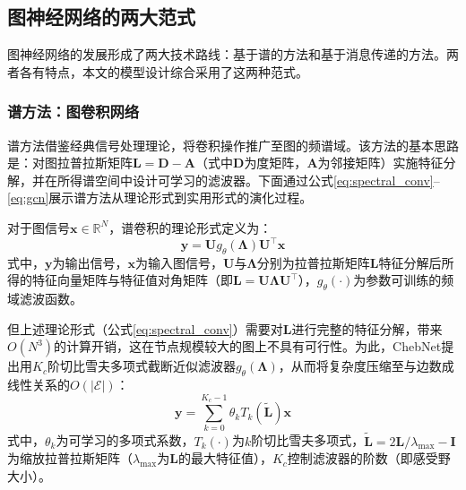 \subsection{图神经网络的两大范式}
\label{subsec:gnn_paradigms}

图神经网络的发展形成了两大技术路线：基于谱的方法和基于消息传递的方法。两者各有特点，本文的模型设计综合采用了这两种范式。

\subsubsection{谱方法：图卷积网络}

谱方法借鉴经典信号处理理论，将卷积操作推广至图的频谱域\citep{bruna2014spectral}。该方法的基本思路是：对图拉普拉斯矩阵$\mathbf{L} = \mathbf{D} - \mathbf{A}$（式中$\mathbf{D}$为度矩阵，$\mathbf{A}$为邻接矩阵）实施特征分解，并在所得谱空间中设计可学习的滤波器。下面通过公式\eqref{eq:spectral_conv}--\eqref{eq:gcn}展示谱方法从理论形式到实用形式的演化过程。

对于图信号$\mathbf{x} \in \mathbb{R}^N$，谱卷积的理论形式定义为：
\begin{equation}
\mathbf{y} = \mathbf{U} g_\theta(\boldsymbol{\Lambda}) \mathbf{U}^\top \mathbf{x}
\label{eq:spectral_conv}
\end{equation}
\noindent 式中，$\mathbf{y}$为输出信号，$\mathbf{x}$为输入图信号，$\mathbf{U}$与$\boldsymbol{\Lambda}$分别为拉普拉斯矩阵$\mathbf{L}$特征分解后所得的特征向量矩阵与特征值对角矩阵（即$\mathbf{L} = \mathbf{U} \boldsymbol{\Lambda} \mathbf{U}^\top$），$g_\theta(\cdot)$为参数可训练的频域滤波函数。

但上述理论形式（公式\eqref{eq:spectral_conv}）需要对$\mathbf{L}$进行完整的特征分解，带来$O(N^3)$的计算开销，这在节点规模较大的图上不具有可行性。为此，ChebNet\citep{defferrard2016convolutional}提出用$K_c$阶切比雪夫多项式截断近似滤波器$g_\theta(\boldsymbol{\Lambda})$，从而将复杂度压缩至与边数成线性关系的$O(|\mathcal{E}|)$：
\begin{equation}
\mathbf{y} = \sum_{k=0}^{K_c-1} \theta_k T_k(\tilde{\mathbf{L}}) \mathbf{x}
\label{eq:chebynet}
\end{equation}
\noindent 式中，$\theta_k$为可学习的多项式系数，$T_k(\cdot)$为$k$阶切比雪夫多项式，$\tilde{\mathbf{L}} = 2\mathbf{L}/\lambda_{\max} - \mathbf{I}$为缩放拉普拉斯矩阵（$\lambda_{\max}$为$\mathbf{L}$的最大特征值），$K_c$控制滤波器的阶数（即感受野大小）。

